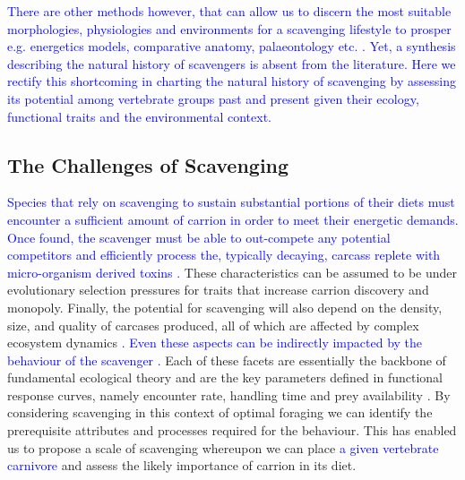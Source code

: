 \documentclass[a4paper,12pt]{article}
\begin{document}
\textcolor{blue}{There are other methods however, that can allow us to discern the most suitable morphologies, physiologies and environments for a scavenging lifestyle to prosper e.g. energetics models, comparative anatomy, palaeontology etc. \citep{shipman1986scavenging,ruxton2003could}. 
Yet, a synthesis describing the natural history of scavengers is absent from the literature.
Here we rectify this shortcoming in charting the natural history of scavenging by assessing its potential among vertebrate groups past and present given their ecology, functional traits and the environmental context.}

\subsection{The Challenges of Scavenging} 

\textcolor{blue}{Species that rely on scavenging to sustain substantial portions of their diets must encounter a sufficient amount of carrion in order to meet their energetic demands.
Once found, the scavenger must be able to out-compete any potential competitors and efficiently process the, typically decaying, carcass replete with micro-organism derived toxins \citep{ruxton2014fruit}.}
These characteristics can be assumed to be under evolutionary selection pressures for traits that increase carrion discovery and monopoly.
Finally, the potential for scavenging will also depend on the density, size, and quality of carcases produced, all of which are affected by complex ecosystem dynamics \textcolor{blue}{\citep{moleon2014inter}. 
Even these aspects can be indirectly impacted by the behaviour of the scavenger \citep{moleon2014inter}.}
Each of these facets are essentially the backbone of fundamental ecological theory and are the key parameters defined in functional response curves, namely encounter rate, handling time and prey availability \citep{jeschke2002predator}.  
By considering scavenging in this context of optimal foraging we can identify the prerequisite attributes and processes required for the behaviour. 
This has enabled us to propose a scale of scavenging whereupon we can place \textcolor{blue}{a given vertebrate carnivore} and assess the likely importance of carrion in its diet. 
\end{document}
